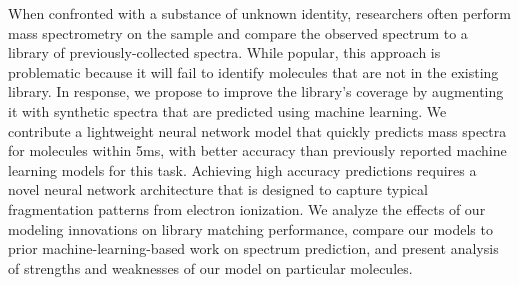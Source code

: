 When confronted with a substance of unknown identity, researchers often perform mass spectrometry on the sample and compare the observed spectrum to a library of previously-collected spectra. While popular, this approach is problematic because it will fail to identify molecules that are not in the existing library. In response, we propose to improve the library's coverage by augmenting it with synthetic spectra that are predicted using machine learning. We contribute a lightweight neural network model that quickly predicts mass spectra for molecules within 5ms, with better accuracy than previously reported machine learning models for this task. Achieving high accuracy predictions requires a novel neural network architecture that is designed to capture typical fragmentation patterns from electron ionization. We analyze the effects of our modeling innovations on library matching performance, compare our models to prior machine-learning-based work on spectrum prediction, and present analysis of strengths and weaknesses of our model on particular molecules.
